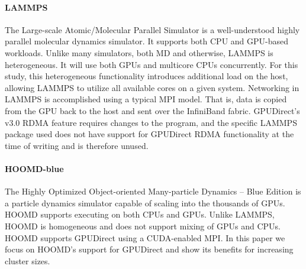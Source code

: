 \paragraph {LAMMPS} The Large-scale Atomic/Molecular Parallel Simulator is a
well-understood highly parallel molecular dynamics simulator.  It supports both
CPU and GPU-based workloads.  Unlike many simulators, both MD and otherwise,
LAMMPS is heterogeneous.  It will use both GPUs and multicore CPUs concurrently.
For this study, this heterogeneous functionality introduces additional load on
the host, allowing LAMMPS to utilize all available cores on a given system.
Networking in LAMMPS is accomplished using a typical MPI model. That is, data is
copied from the GPU back to the host and sent over the InfiniBand fabric.  %
GPUDirect’s v3.0 RDMA feature requires changes to the program, and the specific LAMMPS package used does not have support for GPUDirect RDMA functionality at the time of writing and is therefore unused. %

\paragraph{HOOMD-blue} The Highly Optimized Object-oriented Many-particle
Dynamics -- Blue Edition is a particle dynamics simulator capable of
scaling into the thousands of GPUs.  HOOMD supports executing on both CPUs and
GPUs.  Unlike LAMMPS, HOOMD is homogeneous and does not support mixing
of GPUs and CPUs.  HOOMD supports GPUDirect using a CUDA-enabled MPI.
In this paper we focus on HOOMD's
support for GPUDirect and show its benefits for increasing cluster sizes.  


